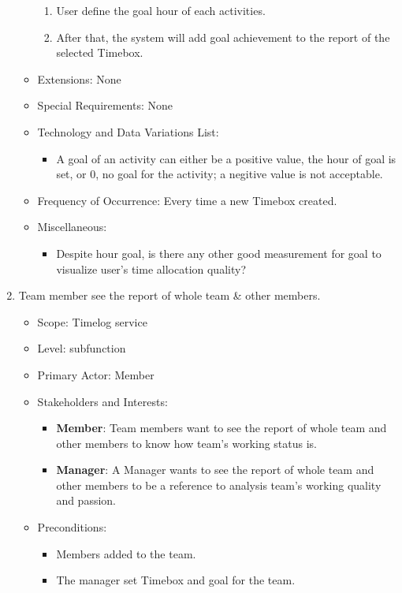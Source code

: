 \documentclass[12pt, a4paper]{article}
\begin{document}
\begin{CJK*}{UTF8}{bkai}
\begin{enumerate}
\begin{itemize}
\begin{enumerate}
              \item User define the goal hour of each activities.
              \item After that, the system will add goal achievement to the report of the selected Timebox.
            \end{enumerate}
          \item Extensions: None
          \item Special Requirements: None
          \item Technology and Data Variations List:
            \begin{itemize}
              \item A goal of an activity can either be a positive value, the hour of goal is set, or 0, no goal for the activity; a negitive value is not acceptable.
            \end{itemize}
          \item Frequency of Occurrence: Every time a new Timebox created.
          \item Miscellaneous:
            \begin{itemize}
              \item Despite hour goal, is there any other good measurement for goal to visualize user's time allocation quality?
            \end{itemize}
        \end{itemize}
      \item Team member see the report of whole team \& other members.
        \begin{itemize}
          \item Scope: Timelog service
          \item Level: subfunction
          \item Primary Actor: Member
          \item Stakeholders and Interests:
            \begin{itemize}
              \item {\bf Member}: Team members want to see the report of whole team and other members to know how team's working status is.
              \item {\bf Manager}: A Manager wants to see the report of whole team and other members to be a reference to analysis team's working quality and passion.
            \end{itemize}
          \item Preconditions:
            \begin{itemize}
              \item Members added to the team.
              \item The manager set Timebox and goal for the team.
            \end{itemize}


\end{itemize}
\end{enumerate}
\end{CJK*}
\end{document}
